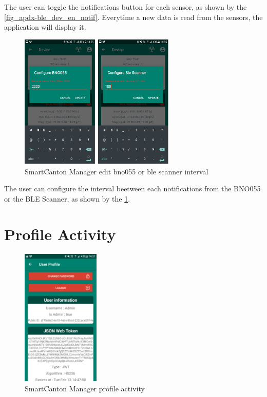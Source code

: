 The user can toggle the notifications button for each sensor, as shown by the \cref{fig_apdx-ble_dev_en_notif}. Everytime a new data is read from the sensors, the application will display it.

\begin{figure}[ht!]
    \centering
    \includegraphics[width=0.66\textwidth]{Figures/Appendixes/Android/ble_dev_change_bno055_orblescan_config.png}
    \caption{SmartCanton Manager edit bno055 or ble scanner interval}
    \label{fig_apdx-ble_dev_change_bno055_orblescan_config}
\end{figure}
The user can configure the interval beetween each notifications from the BNO055 or the BLE Scanner, as shown by the \cref{fig_apdx-ble_dev_change_bno055_orblescan_config}.

\FloatBarrier
\section{Profile Activity}
\begin{figure}[ht!]
    \centering
    \includegraphics[width=0.33\textwidth]{Figures/Appendixes/Android/profile_activity.png}
    \caption{SmartCanton Manager profile activity}
    \label{fig_apdx-profile_activity}
\end{figure}

